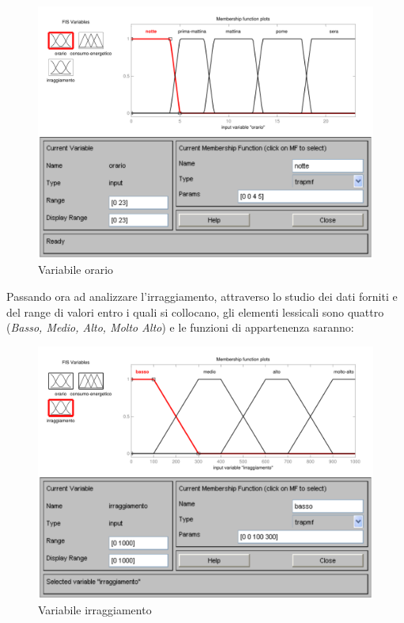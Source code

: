 \begin{figure}
  \centering
  \includegraphics[scale=0.5]{images/fuzzy/variabile_orario.pdf}
  \caption{Variabile orario}
\end{figure}

Passando ora ad analizzare l'irraggiamento, attraverso lo studio dei dati forniti e del range di valori entro i quali si collocano, gli elementi lessicali sono quattro ({\em Basso, Medio, Alto, Molto Alto}) e le funzioni di appartenenza saranno:

\begin{figure}
  \centering
  \includegraphics[scale=0.5]{images/fuzzy/variabile_irraggiamento.pdf}
  \caption{Variabile irraggiamento}
\end{figure}

